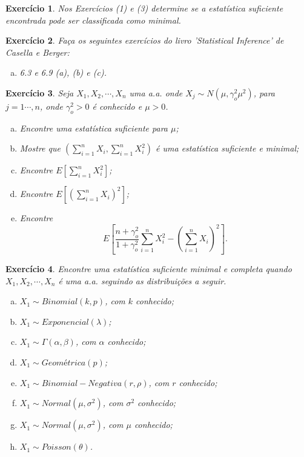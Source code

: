 \documentclass[letter,11pt]{article}
\newtheorem{exer}{Exercício}
\begin{document}
\smallskip
\begin{exer} \rm
Nos Exercícios (1) e (3) determine se a estatística suficiente encontrada pode ser classificada como minimal.
\end{exer}

		
\smallskip
\begin{exer} \rm
Faça os seguintes exercícios do livro 'Statistical Inference' de Casella e Berger: 
\begin{enumerate}[a)]
	\item 6.3 e 6.9 (a), (b) e (c).
\end{enumerate}
\end{exer}

\smallskip
\begin{exer} \rm
Seja $X_1,X_2,\cdots,X_n$ uma a.a. onde $X_j\sim N(\mu,\gamma_o^2\mu^2)$, para $j=1\cdots,n$, onde $\gamma_o^2>0$ é conhecido e $\mu>0$.
\begin{enumerate}[a)]
  \item Encontre uma estatística suficiente para $\mu$;
  \item Mostre que $(\sum_{i=1}^{n}X_i,\sum_{i=1}^{n}X_i^2)$ é uma
estatística suficiente e minimal;
  \item Encontre $E[\sum_{i=1}^{n}X_i^2]$;
  \item Encontre $E[(\sum_{i=1}^{n}X_i)^2]$;
  \item Encontre
\[E\left[\frac{n+\gamma_o^2}{1+\gamma_o^2}\sum_{i=1}^{n}X_i^2-\left(\sum_{i=1}^{n}X_i\right)^2\right].\]
\end{enumerate}
\end{exer}


\smallskip
\begin{exer} \rm 
Encontre uma estatística suficiente minimal e completa quando 
$X_1,X_2,\cdots,X_n$ é uma a.a. seguindo as distribuições a seguir.
\begin{enumerate}[a)]
  \item $X_1\sim Binomial(k,p)$, com $k$ conhecido;
  \item $X_1\sim Exponencial(\lambda)$;
  \item $X_1\sim \Gamma(\alpha,\beta)$, com $\alpha$ conhecido;
  \item $X_1\sim Geométrica(p)$;
  \item $X_1\sim Binomial-Negativa(r,\rho)$, com $r$ conhecido;
  \item $X_1\sim Normal(\mu,\sigma^2)$, com $\sigma^2$ conhecido;
  \item $X_1\sim Normal(\mu,\sigma^2)$, com $\mu$ conhecido;
  \item $X_1\sim Poisson(\theta)$.
\end{enumerate}
\end{exer}
\end{document}

